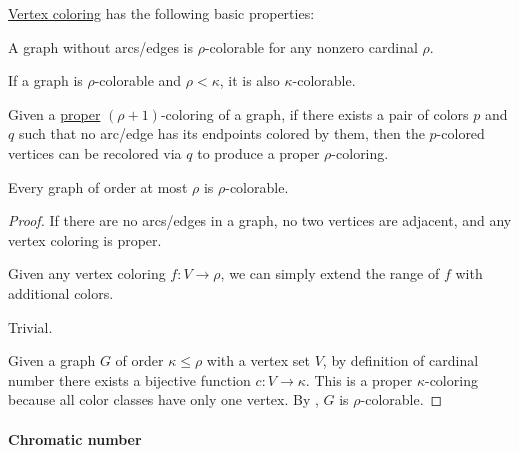 \begin{proposition}\label{thm:def:graph_coloring}
  \hyperref[def:multipartite_graph]{Vertex coloring} has the following basic properties:
  \begin{thmenum}
     A graph without arcs/edges is \( \rho \)-colorable for any nonzero cardinal \( \rho \).

     If a graph is \( \rho \)-colorable and \( \rho < \kappa \), it is also \( \kappa \)-colorable.

     Given a \hyperref[def:graph_coloring/proper]{proper} \( (\rho + 1) \)-coloring of a graph, if there exists a pair of colors \( p \) and \( q \) such that no arc/edge has its endpoints colored by them, then the \( p \)-colored vertices can be recolored via \( q \) to produce a proper \( \rho \)-coloring.

     Every graph of order at most \( \rho \) is \( \rho \)-colorable.
  \end{thmenum}
\end{proposition}
\begin{proof}
   If there are no arcs/edges in a graph, no two vertices are adjacent, and any vertex coloring is proper.

   Given any vertex coloring \( f: V \to \rho \), we can simply extend the range of \( f \) with additional colors.

   Trivial.

   Given a graph \( G \) of order \( \kappa \leq \rho \) with a vertex set \( V \), by definition of cardinal number there exists a bijective function \( c: V \to \kappa \). This is a proper \( \kappa \)-coloring because all color classes have only one vertex. By , \( G \) is \( \rho \)-colorable.
\end{proof}

\paragraph{Chromatic number}

